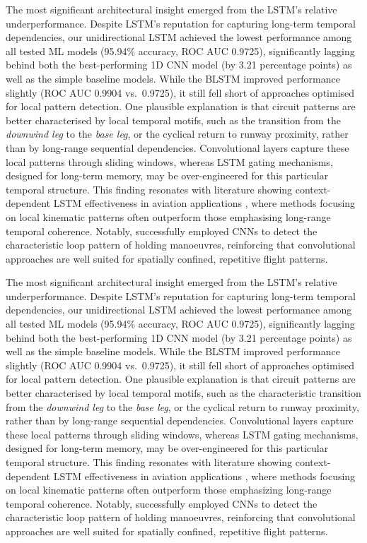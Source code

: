 \documentclass[
  manuscript=proceedings,  %
  layout=preprint,         %
  year=2025,
  volume=x,
]{extra/joas}
\begin{document}
The most significant architectural insight emerged from the LSTM's relative underperformance. Despite LSTM's reputation for capturing long-term temporal dependencies, our unidirectional LSTM achieved the lowest performance among all tested ML models (95.94\% accuracy, ROC AUC 0.9725), significantly lagging behind both the best-performing 1D CNN model (by 3.21 percentage points) as well as the simple baseline models. While the BLSTM improved performance slightly (ROC AUC 0.9904 vs.\ 0.9725), it still fell short of approaches optimised for local pattern detection. One plausible explanation is that circuit patterns are better characterised by local temporal motifs, such as the transition from the \textit{downwind leg} to the \textit{base leg}, or the cyclical return to runway proximity, rather than by long-range sequential dependencies. Convolutional layers capture these local patterns through sliding windows, whereas LSTM gating mechanisms, designed for long-term memory, may be over-engineered for this particular temporal structure. This finding resonates with literature showing context-dependent LSTM effectiveness in aviation applications \cite{fala_ml_2023}, where methods focusing on local kinematic patterns often outperform those emphasising long-range temporal coherence. Notably, \textcite{olive_holding_patterns} successfully employed CNNs to detect the characteristic loop pattern of holding manoeuvres, reinforcing that convolutional approaches are well suited for spatially confined, repetitive flight patterns.

The most significant architectural insight emerged from the LSTM's relative underperformance. Despite LSTM's reputation for capturing long-term temporal dependencies, our unidirectional LSTM achieved the lowest performance among all tested ML models (95.94\% accuracy, ROC AUC 0.9725), significantly lagging behind both the best-performing 1D CNN model (by 3.21 percentage points) as well as the simple baseline models. While the BLSTM improved performance slightly (ROC AUC 0.9904 vs.\
0.9725), it still fell short of approaches optimised for local pattern detection. One plausible explanation is that circuit patterns are better characterised by local temporal motifs, such as the characteristic transition from the \textit{downwind leg} to the \textit{base leg}, or the cyclical return to runway proximity, rather than by long-range sequential dependencies. Convolutional layers capture these local patterns through sliding windows, whereas LSTM gating mechanisms, designed for long-term memory, may be over-engineered for this particular temporal structure. This finding resonates with literature showing context-dependent LSTM effectiveness in aviation applications \cite{fala_ml_2023}, where methods focusing on local kinematic patterns often outperform those emphasizing long-range temporal coherence. Notably, \textcite{olive_holding_patterns} successfully employed CNNs to detect the characteristic loop pattern of holding manoeuvres, reinforcing that convolutional approaches are well suited for spatially confined, repetitive flight patterns.
\end{document}
